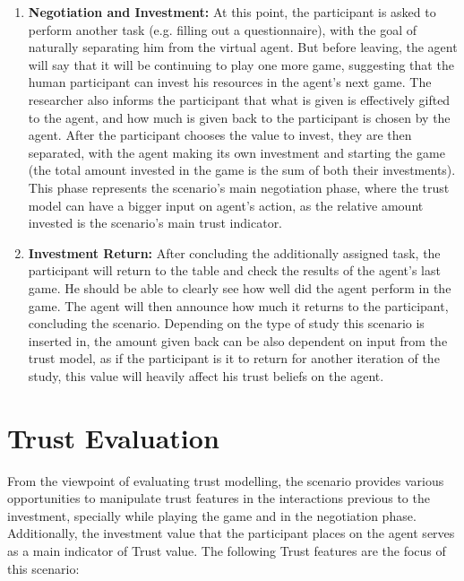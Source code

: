 \begin{enumerate}[label=\textbf{\arabic*.}]
    \item \textbf{Negotiation and Investment:} At this point, the participant is asked to perform another task (e.g. filling out a questionnaire), with the goal of naturally separating him from the virtual agent. But before leaving, the agent will say that it will be continuing to play one more game, suggesting that the human participant can invest his resources in the agent's next game. The researcher also informs the participant that what is given is effectively gifted to the agent, and how much is given back to the participant is chosen by the agent. After the participant chooses the value to invest, they are then separated, with the agent making its own investment and starting the game (the total amount invested in the game is the sum of both their investments). This phase represents the scenario's main negotiation phase, where the trust model can have a bigger input on agent's action, as the relative amount invested is the scenario's main trust indicator.
    
    \item \textbf{Investment Return:} After concluding the additionally assigned task, the participant will return to the table and check the results of the agent's last game. He should be able to clearly see how well did the agent perform in the game. The agent will then announce how much it returns to the participant, concluding the scenario. Depending on the type of study this scenario is inserted in, the amount given back can be also dependent on input from the trust model, as if the participant is it to return for another iteration of the study, this value will heavily affect his trust beliefs on the agent.
\end{enumerate}

\section{Trust Evaluation}
From the viewpoint of evaluating trust modelling, the scenario provides various opportunities to manipulate trust features in the interactions previous to the investment, specially while playing the game and in the negotiation phase. Additionally, the investment value that the participant places on the agent serves as a main indicator of Trust value. The following Trust features are the focus of this scenario:

